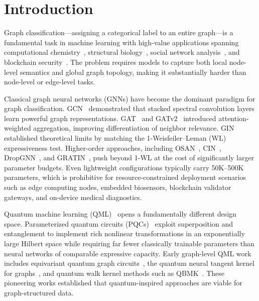 \documentclass[journal]{IEEEtran}
\begin{document}
\maketitle

\section{Introduction}
\label{sec:intro}

Graph classification---assigning a categorical label to an entire graph---is
a fundamental task in machine learning with high-value applications spanning
computational chemistry~\cite{MUTAG1991}, structural
biology~\cite{PROTEINS2003}, social network
analysis~\cite{IMDB2015}, and blockchain security~\cite{Zhuang2020IJCAI,
Liu2021TKDE,Qian2023WWW}. The problem requires models to capture both
local node-level semantics and global graph topology, making it
substantially harder than node-level or edge-level tasks.

Classical graph neural networks (GNNs) have become the dominant paradigm
for graph classification. GCN~\cite{Kipf2017} demonstrated that stacked
spectral convolution layers learn powerful graph representations.
GAT~\cite{Velickovic2018} and GATv2~\cite{Brody2022ICLR} introduced
attention-weighted aggregation, improving differentiation of neighbor
relevance. GIN~\cite{Xu2019GIN} established theoretical limits by matching
the 1-Weisfeiler--Leman (WL) expressiveness test. Higher-order approaches,
including OSAN~\cite{Bause2023ICML}, CIN~\cite{Bodnar2021CIN},
DropGNN~\cite{Papp2021NeurIPS}, and GRATIN~\cite{Abbahaddou2025ICML},
push beyond 1-WL at the cost of significantly larger parameter budgets.
Even lightweight configurations typically carry 50K--500K parameters,
which is prohibitive for resource-constrained deployment scenarios such
as edge computing nodes, embedded biosensors, blockchain validator
gateways, and on-device medical diagnostics.

Quantum machine learning (QML)~\cite{Cerezo2021,
Schuld2021} opens a fundamentally different design space. Parameterized
quantum circuits (PQCs)~\cite{Benedetti2019} exploit superposition and
entanglement to implement rich nonlinear transformations in an exponentially
large Hilbert space while requiring far fewer classically trainable
parameters than neural networks of comparable expressive capacity.
Early graph-level QML work includes equivariant quantum graph
circuits~\cite{Mernyei2022ICML}, the quantum neural tangent kernel for
graphs~\cite{Tang2022NeurIPS}, and quantum walk kernel methods such as
QBMK~\cite{Bai2024ICML}. These pioneering works established that
quantum-inspired approaches are viable for graph-structured data.
\end{document}
